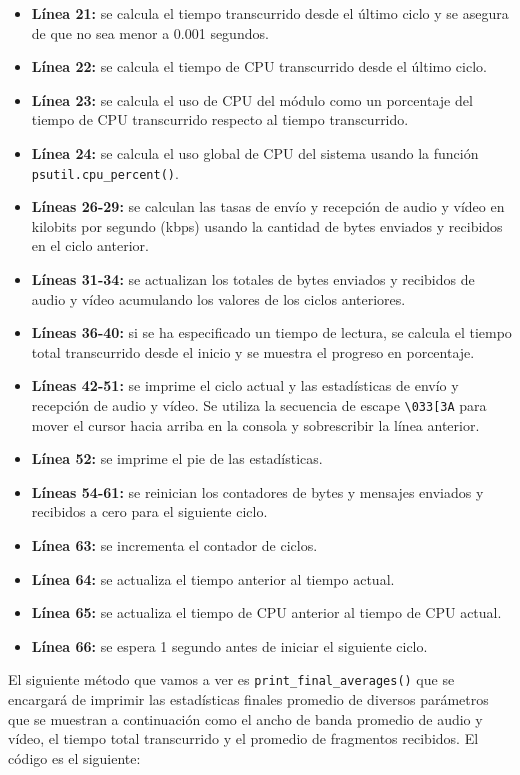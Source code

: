 \begin{itemize}
\begin{itemize}
    \end{itemize}
    \item \textbf{Línea 21:} se calcula el tiempo transcurrido desde el último ciclo y se asegura de que no sea menor a 0.001 segundos.
    \item \textbf{Línea 22:} se calcula el tiempo de CPU transcurrido desde el último ciclo.
    \item \textbf{Línea 23:} se calcula el uso de CPU del módulo como un porcentaje del tiempo de CPU transcurrido respecto al tiempo transcurrido.
    \item \textbf{Línea 24:} se calcula el uso global de CPU del sistema usando la función \texttt{psutil.cpu\_percent()}.
    \item \textbf{Líneas 26-29:} se calculan las tasas de envío y recepción de audio y vídeo en kilobits por segundo (kbps) usando la cantidad de bytes enviados y recibidos en el ciclo anterior.
    \item \textbf{Líneas 31-34:} se actualizan los totales de bytes enviados y recibidos de audio y vídeo acumulando los valores de los ciclos anteriores.
    \item \textbf{Líneas 36-40:} si se ha especificado un tiempo de lectura, se calcula el tiempo total transcurrido desde el inicio y se muestra el progreso en porcentaje.
    \item \textbf{Líneas 42-51:} se imprime el ciclo actual y las estadísticas de envío y recepción de audio y vídeo. Se utiliza la secuencia de escape \texttt{\textbackslash 033[3A} para mover el cursor hacia arriba en la consola y sobrescribir la línea anterior.
    \item \textbf{Línea 52:} se imprime el pie de las estadísticas.
    \item \textbf{Líneas 54-61:} se reinician los contadores de bytes y mensajes enviados y recibidos a cero para el siguiente ciclo.
    \item \textbf{Línea 63:} se incrementa el contador de ciclos.
    \item \textbf{Línea 64:} se actualiza el tiempo anterior al tiempo actual.
    \item \textbf{Línea 65:} se actualiza el tiempo de CPU anterior al tiempo de CPU actual.
    \item \textbf{Línea 66:} se espera 1 segundo antes de iniciar el siguiente ciclo.
\end{itemize}
\vspace{\baselineskip}

El siguiente método que vamos a ver es \texttt{print\_final\_averages()} que se encargará de imprimir las estadísticas finales promedio de diversos parámetros que se muestran a continuación como el ancho de banda promedio de audio y vídeo, el tiempo total transcurrido y el promedio de fragmentos recibidos. El código es el siguiente:

